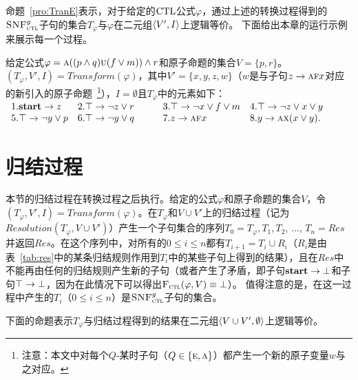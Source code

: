命题~\ref{pro:TranE}表示，对于给定的$\textrm{CTL}$公式$\varphi$，通过上述的转换过程得到的${\textsc{SNF}_{\textsc{ctl}}^g}$子句的集合$T_{\varphi}$与$\varphi$在二元组${\langle{V',I}\rangle}$上逻辑等价。
下面给出本章的运行示例来展示每一个过程。

\begin{example}[运行示例]
	\label{examp:Tran}
	给定公式$\varphi=\textsc{a}((p\wedge q) \textsc{u} (f\vee m)) \wedge r$和原子命题的集合$V=\{p,r\}$。$(T_{\varphi}, V', I) = Transform(\varphi)$，其中$V'=\{x,y,z,w\}$（$w$是与子句$z \rightarrow \textsc{a} \textsc{f} x$对应的新引入的原子命题~\footnote{注意：本文中对每个$Q$-某时子句（$Q\in \{\textsc{e}, \textsc{a}\}$）都产生一个新的原子变量$w$与之对应。}），$I=\emptyset$且$T_{\varphi}$中的元素如下：\\
	$
	\begin{array}{llll}
		\centering
		1. \start\rto z & 2. \top \rto \neg z \vee r \qquad & 3.\top \rto \neg x\vee f \vee m  & 4. \top \rto \neg z \vee x \vee y \\
		5.\top \rto \neg y \vee p &  6.\top \rto \neg y \vee q &
		7. z \rto \ALL \FUTURE x & 8. y \rto \ALL \NEXT(x\vee y).\\
	\end{array}
	$
\end{example}



\section{归结过程}
本节的归结过程在转换过程之后执行。给定的公式$\varphi$和原子命题的集合$V$，令$(T_{\varphi}, V', I) = Transform(\varphi)$。在$T_{\varphi}$和$V\cup V'$上的归结过程（记为$Resolution(T_{\varphi}, V \cup V')$）产生一个子句集合的序列$T_0=T_{\varphi}, T_1, T_2$, $\dots$, $T_n=Res$并返回$Res$。在这个序列中，对所有的$0\leq i \leq n$都有$T_{i+1}=T_i\cup R_i$（$R_i$是由表~\ref{tab:res}中的某条归结规则作用到$T_i$中的某些子句上得到的结果），且在$Res$中不能再由任何的归结规则产生新的子句（或者产生了矛盾，即子句$\textbf{start}\rightarrow \bot$和子句$\top \rightarrow \bot$，因为在此情况下可以得出${\textsc{F}_{\textsc{ctl}}}(\varphi, V) \equiv \bot$）。
值得注意的是，在这一过程中产生的$T_i$（$0\leq i \leq n$）是${\textsc{SNF}_{\textsc{ctl}}^g}$子句的集合。

下面的命题表示$T_{\varphi}$与归结过程得到的结果在二元组${\langle{V\cup V',\emptyset}\rangle}$上逻辑等价。

